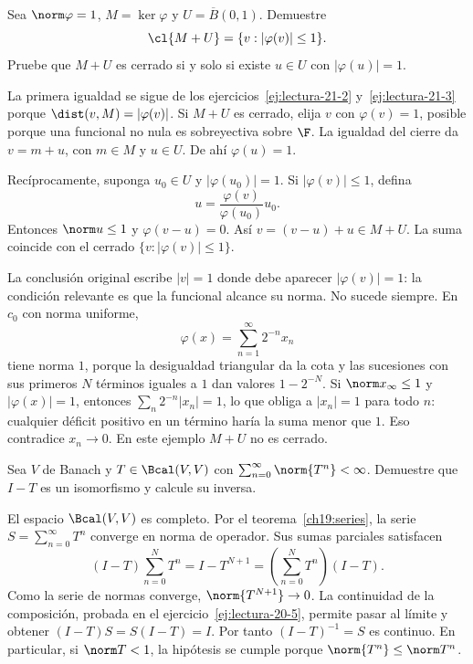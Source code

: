 \begin{ejercicio}\label{ej:lectura-21-4}
Sea $\norm\varphi=1$, $M=\ker\varphi$ y $U=\overline B(0,1)$. Demuestre
\[
 \cl{M+U}=\{v:|\varphi(v)|\leq1\}.
\]
Pruebe que $M+U$ es cerrado si y solo si existe $u\in U$ con $|\varphi(u)|=1$.
\end{ejercicio}
\begin{solucion}
La primera igualdad se sigue de los ejercicios~\ref{ej:lectura-21-2} y~\ref{ej:lectura-21-3} porque $\dist(v,M)=|\varphi(v)|$. Si $M+U$ es cerrado, elija $v$ con $\varphi(v)=1$, posible porque una funcional no nula es sobreyectiva sobre $\F$. La igualdad del cierre da $v=m+u$, con $m\in M$ y $u\in U$. De ahí $\varphi(u)=1$.

Recíprocamente, suponga $u_0\in U$ y $|\varphi(u_0)|=1$. Si $|\varphi(v)|\leq1$, defina
\[
 u=\frac{\varphi(v)}{\varphi(u_0)}u_0.
\]
Entonces $\norm u\leq1$ y $\varphi(v-u)=0$. Así $v=(v-u)+u\in M+U$. La suma coincide con el cerrado $\{v:|\varphi(v)|\leq1\}$.

La conclusión original escribe $|v|=1$ donde debe aparecer $|\varphi(v)|=1$: la condición relevante es que la funcional alcance su norma. No sucede siempre. En $c_0$ con norma uniforme,
\[
 \varphi(x)=\sum_{n=1}^{\infty}2^{-n}x_n
\]
tiene norma $1$, porque la desigualdad triangular da la cota y las sucesiones con sus primeros $N$ términos iguales a $1$ dan valores $1-2^{-N}$. Si $\norm x_\infty\leq1$ y $|\varphi(x)|=1$, entonces $\sum_n2^{-n}|x_n|=1$, lo que obliga a $|x_n|=1$ para todo $n$: cualquier déficit positivo en un término haría la suma menor que $1$. Eso contradice $x_n\to0$. En este ejemplo $M+U$ no es cerrado.
\end{solucion}

\begin{ejercicio}\label{ej:lectura-21-5}
Sea $V$ de Banach y $T\in\Bcal(V,V)$ con $\sum_{n=0}^{\infty}\norm{T^n}<\infty$. Demuestre que $I-T$ es un isomorfismo y calcule su inversa.
\end{ejercicio}
\begin{solucion}
El espacio $\Bcal(V,V)$ es completo. Por el teorema~\ref{ch19:series}, la serie $S=\sum_{n=0}^{\infty}T^n$ converge en norma de operador. Sus sumas parciales satisfacen
\[
 (I-T)\sum_{n=0}^NT^n=I-T^{N+1}
 =\left(\sum_{n=0}^NT^n\right)(I-T).
\]
Como la serie de normas converge, $\norm{T^{N+1}}\to0$. La continuidad de la composición, probada en el ejercicio~\ref{ej:lectura-20-5}, permite pasar al límite y obtener $(I-T)S=S(I-T)=I$. Por tanto $(I-T)^{-1}=S$ es continuo. En particular, si $\norm T<1$, la hipótesis se cumple porque $\norm{T^n}\leq\norm T^n$.
\end{solucion}

